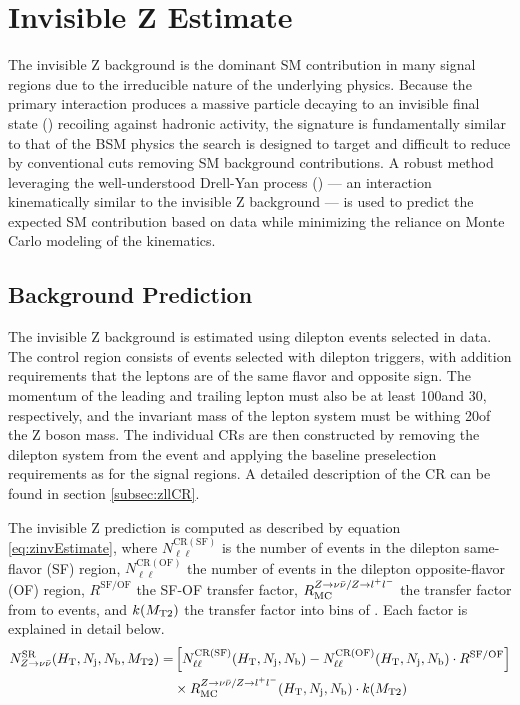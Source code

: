 \section{Invisible Z Estimate}
\label{sec:zinv}

The invisible Z background is the dominant SM contribution in many signal regions due to the irreducible nature of the underlying physics. Because the primary interaction produces a massive particle decaying to an invisible final state (\znunu) recoiling against hadronic activity, the signature is fundamentally similar to that of the BSM physics the search is designed to target and difficult to reduce by conventional cuts removing SM background contributions. A robust method leveraging the well-understood Drell-Yan process (\zll) --- an interaction kinematically similar to the invisible Z background --- is used to predict the expected SM contribution based on data while minimizing the reliance on Monte Carlo modeling of the kinematics.

\subsection{Background Prediction}
\label{subsec:zinvPrediction}
The invisible Z background is estimated using dilepton events selected in data. The control region consists of events selected with dilepton triggers, with addition requirements that the leptons are of the same flavor and opposite sign. The momentum of the leading and trailing lepton must also be at least 100\GeV and 30\GeV, respectively, and the invariant mass of the lepton system \mll must be withing 20\GeV of the Z boson mass. The individual CRs are then constructed by removing the dilepton system from the event and applying the baseline preselection requirements as for the signal regions. A detailed description of the CR can be found in section \ref{subsec:zllCR}.

The invisible Z prediction is computed as described by equation \ref{eq:zinvEstimate}, where $N_{\ell\ell}^{\mathrm{CR(SF)}}$ is the number of events in the dilepton same-flavor (SF) region, $N_{\ell\ell}^{\mathrm{CR(OF)}}$ the number of events in the dilepton opposite-flavor (OF) region, $R^{\mathrm{SF/OF}}$ the SF-OF transfer factor, $R_{\mathrm{MC}}^{Z\rightarrow\nu\bar{\nu} / Z\rightarrow l^+ l^-}$ the transfer factor from \zll to \znunu events, and $k(M_{\mathrm{T2}})$ the transfer factor into bins of \mttwo. Each factor is explained in detail below. 
\begin{align}
		N_{Z\rightarrow\nu\bar{\nu}}^{\mathrm{SR}}(H_{\mathrm{T}},N_\mathrm{j},N_\mathrm{b},M_{\mathrm{T2}}) =& \left[ N_{\ell\ell}^{\mathrm{CR(SF)}}(H_{\mathrm{T}},N_\mathrm{j},N_\mathrm{b}) - N_{\ell\ell}^{\mathrm{CR(OF)}}(H_{\mathrm{T}},N_\mathrm{j},N_\mathrm{b}) \cdot R^{\mathrm{SF/OF}} \right] \nonumber \\
		& \times R_{\mathrm{MC}}^{Z\rightarrow\nu\bar{\nu} / Z\rightarrow l^+ l^-}(H_{\mathrm{T}},N_\mathrm{j},N_\mathrm{b}) \cdot k(M_{\mathrm{T2}})
	\label{eq:zinvEstimate}
\end{align}

